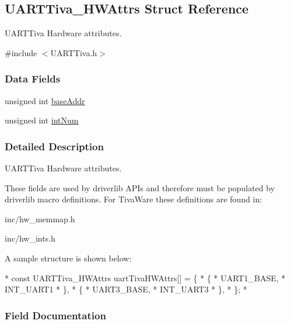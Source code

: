 \subsection{U\-A\-R\-T\-Tiva\-\_\-\-H\-W\-Attrs Struct Reference}
\label{struct_u_a_r_t_tiva___h_w_attrs}


U\-A\-R\-T\-Tiva Hardware attributes.  




{\ttfamily \#include $<$U\-A\-R\-T\-Tiva.\-h$>$}

\subsubsection*{Data Fields}
\begin{DoxyCompactItemize}
\item 
unsigned int \hyperlink{struct_u_a_r_t_tiva___h_w_attrs_abecf13eceeaf44f1781aa2bfae1edad4}{base\-Addr}
\item 
unsigned int \hyperlink{struct_u_a_r_t_tiva___h_w_attrs_a3353583599880bab5429fcbbd189f89c}{int\-Num}
\end{DoxyCompactItemize}


\subsubsection{Detailed Description}
U\-A\-R\-T\-Tiva Hardware attributes. 

These fields are used by driverlib A\-P\-Is and therefore must be populated by driverlib macro definitions. For Tiva\-Ware these definitions are found in\-:
\begin{DoxyItemize}
\item inc/hw\-\_\-memmap.\-h
\item inc/hw\-\_\-ints.\-h
\end{DoxyItemize}

A sample structure is shown below\-: 
\begin{DoxyCode}
*  \textcolor{keyword}{const} UARTTiva_HWAttrs uartTivaHWAttrs[] = \{
*      \{
*          UART1\_BASE,
*          INT\_UART1
*      \},
*      \{
*          UART3\_BASE,
*          INT\_UART3
*      \},
*  \};
*  
\end{DoxyCode}
 

\subsubsection{Field Documentation}
